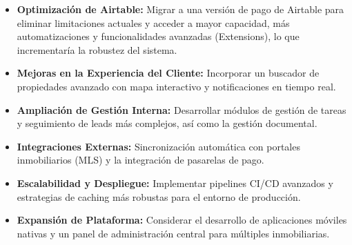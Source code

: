 \begin{itemize}
    \item \textbf{Optimización de Airtable:} Migrar a una versión de pago de Airtable para eliminar limitaciones actuales y acceder a mayor capacidad, más automatizaciones y funcionalidades avanzadas (Extensions), lo que incrementaría la robustez del sistema.
    
    \item \textbf{Mejoras en la Experiencia del Cliente:} Incorporar un buscador de propiedades avanzado con mapa interactivo y notificaciones en tiempo real.

    \item \textbf{Ampliación de Gestión Interna:} Desarrollar módulos de gestión de tareas y seguimiento de leads más complejos, así como la gestión documental.

    \item \textbf{Integraciones Externas:} Sincronización automática con portales inmobiliarios (MLS) y la integración de pasarelas de pago.

    \item \textbf{Escalabilidad y Despliegue:} Implementar pipelines CI/CD avanzados y estrategias de caching más robustas para el entorno de producción.

    \item \textbf{Expansión de Plataforma:} Considerar el desarrollo de aplicaciones móviles nativas y un panel de administración central para múltiples inmobiliarias.
\end{itemize}


\label{sec:bibliografia}

